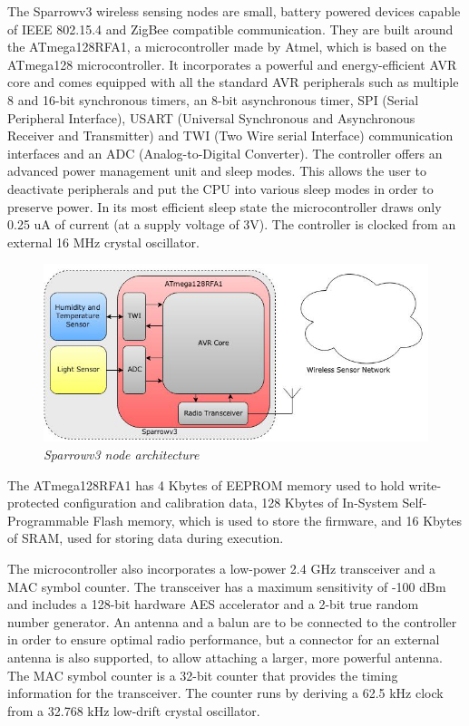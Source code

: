 The Sparrowv3 wireless sensing nodes are small, battery powered devices capable
of IEEE 802.15.4 and ZigBee compatible communication. They are built around the
\mbox{ATmega128RFA1}, a microcontroller made by Atmel, which is based on the
\mbox{ATmega128} microcontroller. It incorporates a powerful and
energy-efficient AVR core and comes equipped with all the standard AVR
peripherals such as multiple 8 and 16-bit synchronous timers, an 8-bit
asynchronous timer, SPI (Serial Peripheral Interface), USART (Universal
Synchronous and Asynchronous Receiver and Transmitter) and TWI (Two Wire serial
Interface) communication interfaces and an ADC (Analog-to-Digital Converter).
The controller offers an advanced power management unit and sleep modes. This
allows the user to deactivate peripherals and put the CPU into various sleep
modes in order to preserve power. In its most efficient sleep state the
microcontroller draws only 0.25 uA of current (at a supply voltage of 3V). The
controller is clocked from an external 16 MHz crystal oscillator.

\begin{figure}[ht]
	\begin{center}
		\includegraphics[width=\textwidth]{img/sparrowv3_node.jpg}
	\end{center}
	\caption{\small \itshape{Sparrowv3 node architecture}}
\end{figure}

The \mbox{ATmega128RFA1} has 4 Kbytes of EEPROM memory used to hold
write-protected configuration and calibration data, 128 Kbytes of In-System
Self-Programmable Flash memory, which is used to store the firmware, and 16
Kbytes of SRAM, used for storing data during execution.

The microcontroller also incorporates a low-power 2.4 GHz transceiver and a MAC
symbol counter. The transceiver has a maximum sensitivity of -100 dBm and
includes a 128-bit hardware AES accelerator and a 2-bit true random number
generator. An antenna and a balun are to be connected to the controller in
order to ensure optimal radio performance, but a connector for an external
antenna is also supported, to allow attaching a larger, more powerful antenna.
The MAC symbol counter is a 32-bit counter that provides the timing information
for the transceiver. The counter runs by deriving a 62.5 kHz clock from a
32.768 kHz low-drift crystal oscillator. 

